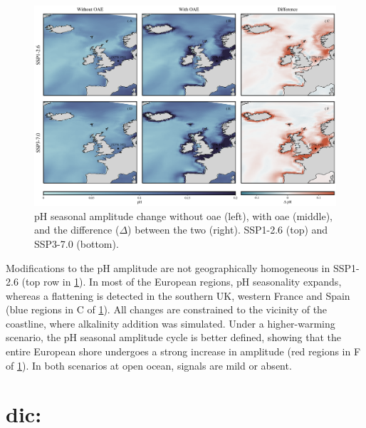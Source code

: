 \begin{figure}[H]
\caption[pH seasonal amplitude change]{pH seasonal amplitude change without \ac{oae} (left), with \ac{oae} (middle), and the difference ($\Delta$) between the two (right). SSP1-2.6 (top) and SSP3-7.0 (bottom).}
\label{phamplitude}
\centering
\includegraphics[width=15cm]{fig/3_Results/pH/ph_ampl.png}

\end{figure}

Modifications to the pH amplitude are not geographically homogeneous in SSP1-2.6 (top row in \cref{phamplitude}). In most of the European regions, pH seasonality expands, whereas a flattening is detected in the southern UK, western France and Spain (blue regions in C of \cref{phamplitude}). All changes are constrained to the vicinity of the coastline, where alkalinity addition was simulated. Under a higher-warming scenario, the pH seasonal amplitude cycle is better defined, showing that the entire European shore undergoes a strong increase in amplitude (red regions in F of \cref{phamplitude}). In both scenarios at open ocean, signals are mild or absent. 

\section[\texorpdfstring{DIC}{DIC}]{\ac{dic}:}

